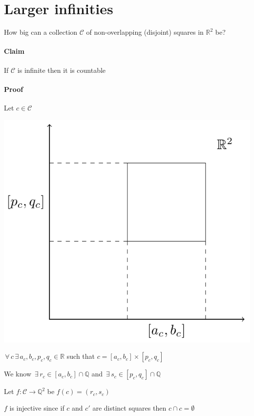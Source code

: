 \documentclass{article}
\newcommand{\bb}[1]{\mathbb{#1}}
\newcommand{\A}{\,\forall\,}
\newcommand{\E}{\,\exists\,}
\begin{document}
\section{Larger infinities}

How big can a collection \(\mathcal{C}\) of non-overlapping (disjoint) squares in \(\bb R^2\) be?

\paragraph{Claim} If \(\mathcal{C}\) is infinite then it is countable

\paragraph{Proof} Let \(c\in\mathcal C\)

\begin{center}
\includegraphics[scale=0.3]{SquaresInR2}
\end{center}

\(\A c\E a_c,b_c,p_c,q_c\in\bb R\) such that \(c=[a_c,b_c]\times[p_c,q_c]\)

We know \(\E r_c\in[a_c,b_c]\cap\bb Q\) and \(\E s_c\in[p_c,q_c]\cap\bb Q\)

Let \(f:\mathcal C\to \bb Q^2\) be \(f(c)=(r_c,s_c)\)

\(f\) is injective since if \(c\) and \(c'\) are distinct squares then \(c\cap c=\emptyset\)
\end{document}
